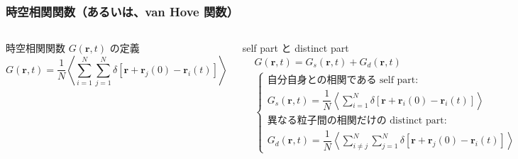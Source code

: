 \documentclass[12pt, dvipdfmx]{beamer}
\begin{document}
\begin{frame}
\frametitle{時空相関関数（あるいは、van Hove 関数）}
\vspace{-2mm}
\begin{columns}[T, totalwidth=\linewidth]
\begin{block}{時空相関関数 $G(\bm{r}, t)$ の定義}
\vspace{-4mm}
\scriptsize
\begin{equation*}
G(\bm{r}, t) = \dfrac{1}{N}\left\langle \sum_{i=1}^{N} \sum_{j=1}^{N} \delta[\bm{r} + \bm{r}_j(0) - \bm{r}_i(t)] \right\rangle
\end{equation*}
\normalsize
\end{block}
\vspace{-1mm}
\begin{block}{self part と distinct part}
\vspace{-4mm}
\scriptsize
\begin{align*}
	&G(\bm{r}, t) = G_s(\bm{r}, t) + G_d(\bm{r}, t) \\
	&\begin{cases}
	\text{自分自身との相関である self part:}\\
	G_s(\bm{r}, t) = \dfrac{1}{N}\left\langle \displaystyle \sum_{i=1}^{N} \delta[\bm{r} + \bm{r}_i(0) - \bm{r}_i(t)] \right\rangle \\[12pt]
	\text{異なる粒子間の相関だけの distinct part:}\\
	G_d(\bm{r}, t) = \dfrac{1}{N}\left\langle \displaystyle \sum_{i \neq j}^{N} \displaystyle \sum_{j=1}^{N} \delta[\bm{r} + \bm{r}_j(0) - \bm{r}_i(t)] \right\rangle
 	\end{cases}
\end{align*}
\normalsize
\end{block}

\texttt{[image: G(rt).pdf]}

\centering
粒子の移動のイメージ\\
$\bm{r}_i(0) \rightarrow \bm{r}_i(t)$ へと移動

\end{columns}
\end{frame}
\end{document}

